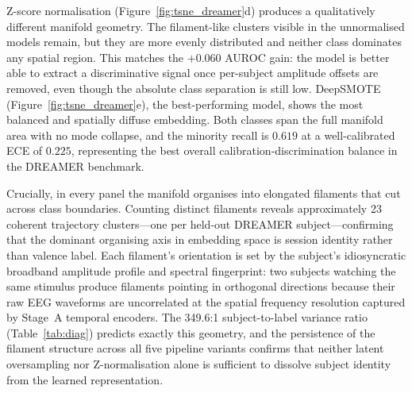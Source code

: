 \documentclass[a4paper,fleqn]{cas-sc}
\begin{document}
Z-score normalisation (Figure~\ref{fig:tsne_dreamer}d) produces a qualitatively different manifold geometry. The filament-like clusters visible in the unnormalised models remain, but they are more evenly distributed and neither class dominates any spatial region. This matches the $+0.060$ AUROC gain: the model is better able to extract a discriminative signal once per-subject amplitude offsets are removed, even though the absolute class separation is still low. DeepSMOTE (Figure~\ref{fig:tsne_dreamer}e), the best-performing model, shows the most balanced and spatially diffuse embedding. Both classes span the full manifold area with no mode collapse, and the minority recall is $0.619$ at a well-calibrated ECE of $0.225$, representing the best overall calibration-discrimination balance in the DREAMER benchmark.

Crucially, in every panel the manifold organises into elongated filaments that cut across class boundaries. Counting distinct filaments reveals approximately 23 coherent trajectory clusters---one per held-out DREAMER subject---confirming that the dominant organising axis in embedding space is session identity rather than valence label. Each filament's orientation is set by the subject's idiosyncratic broadband amplitude profile and spectral fingerprint: two subjects watching the same stimulus produce filaments pointing in orthogonal directions because their raw EEG waveforms are uncorrelated at the spatial frequency resolution captured by Stage~A temporal encoders. The 349.6:1 subject-to-label variance ratio (Table~\ref{tab:diag}) predicts exactly this geometry, and the persistence of the filament structure across all five pipeline variants confirms that neither latent oversampling nor Z-normalisation alone is sufficient to dissolve subject identity from the learned representation.
\end{document}
